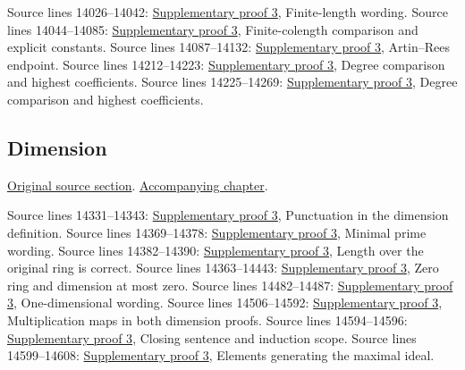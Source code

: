 \begin{AlgebraSourceRoutes}
 Source lines 14026--14042: \hyperlink{algebra_local_hilbert_dimension_notes_20260927}{Supplementary proof 3}, Finite-length wording.
 Source lines 14044--14085: \hyperlink{algebra_local_hilbert_dimension_notes_20260927}{Supplementary proof 3}, Finite-colength comparison and explicit constants.
 Source lines 14087--14132: \hyperlink{algebra_local_hilbert_dimension_notes_20260927}{Supplementary proof 3}, Artin–Rees endpoint.
 Source lines 14212--14223: \hyperlink{algebra_local_hilbert_dimension_notes_20260927}{Supplementary proof 3}, Degree comparison and highest coefficients.
 Source lines 14225--14269: \hyperlink{algebra_local_hilbert_dimension_notes_20260927}{Supplementary proof 3}, Degree comparison and highest coefficients.
\end{AlgebraSourceRoutes}

\subsection{Dimension}
\hypertarget{algebra-source-section-dimension}{}
\noindent\href{https://github.com/stacks/stacks-project/blob/a04446e57ec1fbc252a871afcec7752fb2807b14/algebra.tex\#L14305}{Original source section}. \href{algebra.pdf\#nameddest=section-dimension}{Accompanying chapter}.

\begin{AlgebraSourceRoutes}
 Source lines 14331--14343: \hyperlink{algebra_local_hilbert_dimension_notes_20260927}{Supplementary proof 3}, Punctuation in the dimension definition.
 Source lines 14369--14378: \hyperlink{algebra_local_hilbert_dimension_notes_20260927}{Supplementary proof 3}, Minimal prime wording.
 Source lines 14382--14390: \hyperlink{algebra_local_hilbert_dimension_notes_20260927}{Supplementary proof 3}, Length over the original ring is correct.
 Source lines 14363--14443: \hyperlink{algebra_local_hilbert_dimension_notes_20260927}{Supplementary proof 3}, Zero ring and dimension at most zero.
 Source lines 14482--14487: \hyperlink{algebra_local_hilbert_dimension_notes_20260927}{Supplementary proof 3}, One-dimensional wording.
 Source lines 14506--14592: \hyperlink{algebra_local_hilbert_dimension_notes_20260927}{Supplementary proof 3}, Multiplication maps in both dimension proofs.
 Source lines 14594--14596: \hyperlink{algebra_local_hilbert_dimension_notes_20260927}{Supplementary proof 3}, Closing sentence and induction scope.
 Source lines 14599--14608: \hyperlink{algebra_local_hilbert_dimension_notes_20260927}{Supplementary proof 3}, Elements generating the maximal ideal.
\end{AlgebraSourceRoutes}

